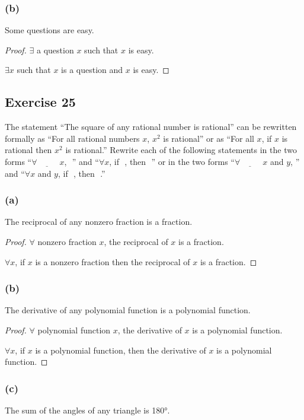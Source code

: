 \documentclass[14pt]{extarticle}
\newcommand{\fbl}{\underline{\hspace{1cm}}\,\,}
\newcommand{\fa}{\forall}
\newcommand{\te}{\exists}
\begin{document}
\subsubsection{(b)}
Some questions are easy.

\begin{proof}
$\te$ a question $x$ such that $x$ is easy.

$\te x$ such that $x$ is a question and $x$ is easy.
\end{proof}

\subsection{Exercise 25}
The statement “The square of any rational number is rational” can be rewritten formally as “For all rational numbers $x$, $x^2$ is rational” or as “For all $x$, if $x$ is rational then $x^2$ is rational.” Rewrite each of the following statements in the two forms “$\fa \fbl x$, \fbl” and “$\fa x$, if \fbl, then \fbl” or in the two forms “$\fa \fbl x$ and $y$, ”\fbl and “$\fa x$ and $y$, if \fbl, then \fbl.”

\subsubsection{(a)}
The reciprocal of any nonzero fraction is a fraction.

\begin{proof}
$\fa$ nonzero fraction $x$, the reciprocal of $x$ is a fraction.

$\fa x$, if $x$ is a nonzero fraction then the reciprocal of $x$ is a fraction.
\end{proof}

\subsubsection{(b)}
The derivative of any polynomial function is a polynomial function.

\begin{proof}
$\fa$ polynomial function $x$, the derivative of $x$ is a polynomial function. 

$\fa x$, if $x$ is a polynomial function, then the derivative of $x$ is a polynomial function.
\end{proof}

\subsubsection{(c)}
The sum of the angles of any triangle is 180°.
\end{document}
